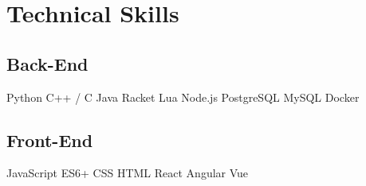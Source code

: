 \documentclass[]{deedy-resume-openfont}
\begin{document}
\begin{minipage}[t]{0.99\textwidth}
\section{Technical Skills}
\subsection{Back-End}
Python \textbullet{} C++ / C \textbullet{} Java \textbullet{} Racket \textbullet{} Lua \textbullet{} Node.js \textbullet{} PostgreSQL \textbullet{} MySQL \textbullet{} Docker 
\sectionsep
\subsection{Front-End}
JavaScript ES6+ \textbullet{} CSS \textbullet{} HTML \textbullet{} React \textbullet{} Angular \textbullet{} Vue
\sectionsep










\end{minipage} 
\end{document}
